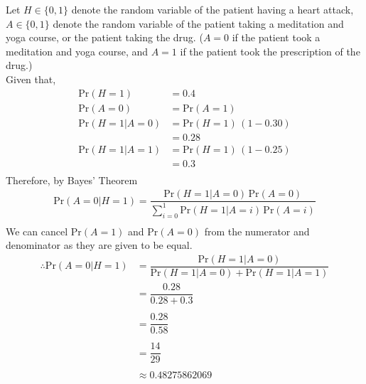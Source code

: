 Let $H \in \{ 0, 1\}$ denote the random variable of the patient having a heart attack, $A \in \{ 0, 1\} $ denote the random variable of the patient taking a meditation and yoga course, or the patient taking the drug. ($A=0$ if the patient took a meditation and yoga course, and $A=1$ if the patient took the prescription of the drug.)\\
Given that,
\begin{align*}
\text{Pr}(H=1) &= 0.4 \\
\text{Pr}(A=0) &= \text{Pr}(A=1)\\
\text{Pr}(H=1|A=0) &= \text{Pr}(H=1)\,(1-0.30)\\
&= 0.28 \\
\text{Pr}(H=1|A=1) &= \text{Pr}(H=1)\,(1-0.25)\\
&= 0.3\\
\end{align*}
Therefore, by Bayes' Theorem
\begin{align*}
\text{Pr}(A=0|H=1) = \dfrac{\text{Pr}(H=1|A=0)\,\text{Pr}(A=0)}{\sum_{i=0} ^ 1 \text{Pr}(H=1|A=i)\,\text{Pr}(A=i)} \\
\end{align*}
We can cancel $\text{Pr}(A=1)$ and $\text{Pr}(A=0)$ from the numerator and denominator as they are given to be equal.\\
\begin{align*}
\therefore \text{Pr}(A=0|H=1) &= \dfrac{\text{Pr}(H=1|A=0)}{\text{Pr}(H=1|A=0) + \text{Pr}(H=1|A=1)} \\
&= \dfrac{0.28}{0.28 + 0.3} \\ ~\\[-1em]
&= \dfrac{0.28}{0.58} \\ ~\\[-1em]
&= \dfrac{14}{29} \\ ~\\[-1em]
&\approx 0.48275862069
\end{align*}